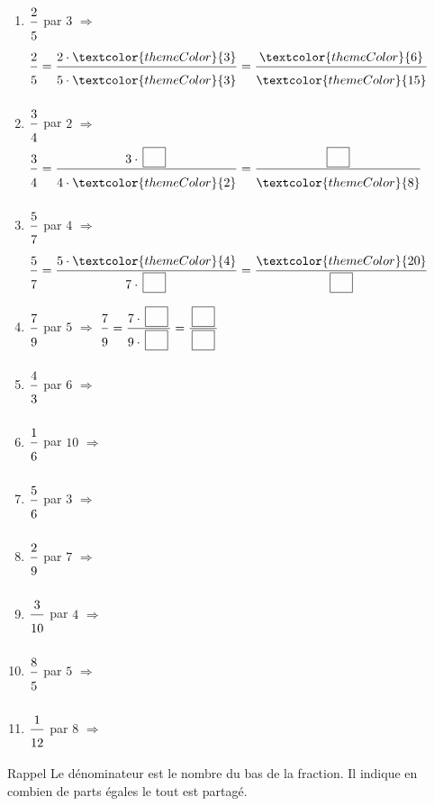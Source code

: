 \begin{enumerate}[leftmargin=*,align=parleft, label=\alph*), itemsep=9pt]
\item $\FA{2}{5}$ par $3$ \quad $\Longrightarrow$ \quad $\FA{2}{5}=\FA{2 \cdot \textcolor{themeColor}{3}}{5 \cdot \textcolor{themeColor}{3}}=\FA{\textcolor{themeColor}{6}}{\textcolor{themeColor}{15}}$
\item $\FA{3}{4}$ par $2$ \quad $\Longrightarrow$ \quad $\FA{3}{4}=\FA{3 \cdot \CaseC}{4 \cdot \textcolor{themeColor}{2}}=\FA{\CaseC}{\textcolor{themeColor}{8}}$
\item $\FA{5}{7}$ par $4$ \quad $\Longrightarrow$ \quad $\FA{5}{7}=\FA{5 \cdot \textcolor{themeColor}{4}}{7 \cdot \CaseC}=\FA{\textcolor{themeColor}{20}}{\CaseC}$
\item $\FA{7}{9}$ par $5$ \quad $\Longrightarrow$ \quad $\FA{7}{9}=\FA{7 \cdot \CaseC}{9 \cdot \CaseC}=\FA{\CaseC}{\CaseC}$
\item $\FA{4}{3}$ par $6$ \quad $\Longrightarrow$
\item $\FA{1}{6}$ par $10$ \quad $\Longrightarrow$
\item $\FA{5}{6}$ par $3$ \quad $\Longrightarrow$
\item $\FA{2}{9}$ par $7$ \quad $\Longrightarrow$
\item $\FA{3}{10}$ par $4$ \quad $\Longrightarrow$
\item $\FA{8}{5}$ par $5$ \quad $\Longrightarrow$
\item $\FA{1}{12}$ par $8$ \quad $\Longrightarrow$
\end{enumerate}

\newpage
{}

\begin{astuce}{Rappel}
Le \textcolor{themeColor}{dénominateur} est le nombre du bas de la fraction. Il indique en combien de parts égales le tout est partagé.
\end{astuce}

